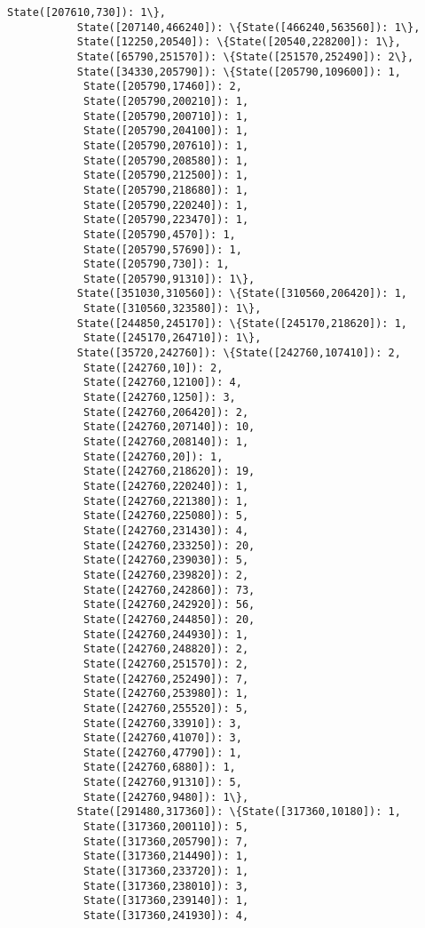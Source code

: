 \documentclass[11pt]{article}
\begin{document}
\begin{Verbatim}[commandchars=\\\{\}]
            State([207610,730]): 1\},
           State([207140,466240]): \{State([466240,563560]): 1\},
           State([12250,20540]): \{State([20540,228200]): 1\},
           State([65790,251570]): \{State([251570,252490]): 2\},
           State([34330,205790]): \{State([205790,109600]): 1,
            State([205790,17460]): 2,
            State([205790,200210]): 1,
            State([205790,200710]): 1,
            State([205790,204100]): 1,
            State([205790,207610]): 1,
            State([205790,208580]): 1,
            State([205790,212500]): 1,
            State([205790,218680]): 1,
            State([205790,220240]): 1,
            State([205790,223470]): 1,
            State([205790,4570]): 1,
            State([205790,57690]): 1,
            State([205790,730]): 1,
            State([205790,91310]): 1\},
           State([351030,310560]): \{State([310560,206420]): 1,
            State([310560,323580]): 1\},
           State([244850,245170]): \{State([245170,218620]): 1,
            State([245170,264710]): 1\},
           State([35720,242760]): \{State([242760,107410]): 2,
            State([242760,10]): 2,
            State([242760,12100]): 4,
            State([242760,1250]): 3,
            State([242760,206420]): 2,
            State([242760,207140]): 10,
            State([242760,208140]): 1,
            State([242760,20]): 1,
            State([242760,218620]): 19,
            State([242760,220240]): 1,
            State([242760,221380]): 1,
            State([242760,225080]): 5,
            State([242760,231430]): 4,
            State([242760,233250]): 20,
            State([242760,239030]): 5,
            State([242760,239820]): 2,
            State([242760,242860]): 73,
            State([242760,242920]): 56,
            State([242760,244850]): 20,
            State([242760,244930]): 1,
            State([242760,248820]): 2,
            State([242760,251570]): 2,
            State([242760,252490]): 7,
            State([242760,253980]): 1,
            State([242760,255520]): 5,
            State([242760,33910]): 3,
            State([242760,41070]): 3,
            State([242760,47790]): 1,
            State([242760,6880]): 1,
            State([242760,91310]): 5,
            State([242760,9480]): 1\},
           State([291480,317360]): \{State([317360,10180]): 1,
            State([317360,200110]): 5,
            State([317360,205790]): 7,
            State([317360,214490]): 1,
            State([317360,233720]): 1,
            State([317360,238010]): 3,
            State([317360,239140]): 1,
            State([317360,241930]): 4,

\end{Verbatim}
\end{document}
